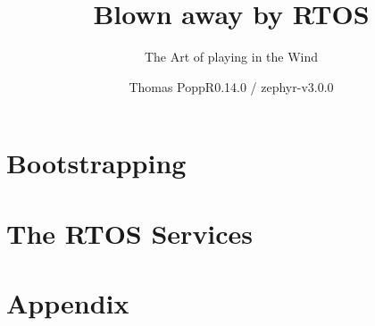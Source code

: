 \documentclass[11pt,fleqn]{book}
\title{Blown away by \Zephyr RTOS}
\author{Thomas Popp\hfill \normalsize{R0.14.0 / zephyr-v3.0.0}}
\subtitle{The Art of playing in the Wind}
\begin{document}
    
    \mnfrontpage

    \tableofcontents
    
    \part{Bootstrapping}
    
    
 
    \part{The RTOS Services}
    
    
    \part{Appendix}
    \appendix
    
\end{document}
